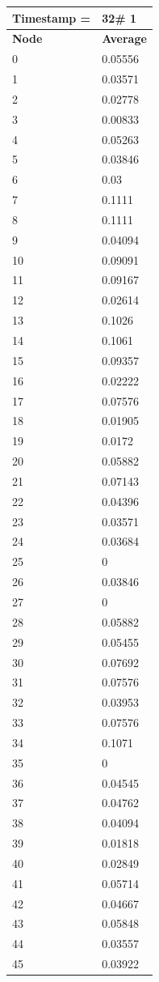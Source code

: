 \begin{tabular}{|l||l|}
\hline
\textbf{Timestamp =} & \textbf{32}\# 1\\\hline
	\textbf{Node} & \textbf{Average} \\ \hline
\hline
	0 & 0.05556 \\ \hline
	1 & 0.03571 \\ \hline
	2 & 0.02778 \\ \hline
	3 & 0.00833 \\ \hline
	4 & 0.05263 \\ \hline
	5 & 0.03846 \\ \hline
	6 & 0.03 \\ \hline
	7 & 0.1111 \\ \hline
	8 & 0.1111 \\ \hline
	9 & 0.04094 \\ \hline
	10 & 0.09091 \\ \hline
	11 & 0.09167 \\ \hline
	12 & 0.02614 \\ \hline
	13 & 0.1026 \\ \hline
	14 & 0.1061 \\ \hline
	15 & 0.09357 \\ \hline
	16 & 0.02222 \\ \hline
	17 & 0.07576 \\ \hline
	18 & 0.01905 \\ \hline
	19 & 0.0172 \\ \hline
	20 & 0.05882 \\ \hline
	21 & 0.07143 \\ \hline
	22 & 0.04396 \\ \hline
	23 & 0.03571 \\ \hline
	24 & 0.03684 \\ \hline
	25 & 0 \\ \hline
	26 & 0.03846 \\ \hline
	27 & 0 \\ \hline
	28 & 0.05882 \\ \hline
	29 & 0.05455 \\ \hline
	30 & 0.07692 \\ \hline
	31 & 0.07576 \\ \hline
	32 & 0.03953 \\ \hline
	33 & 0.07576 \\ \hline
	34 & 0.1071 \\ \hline
	35 & 0 \\ \hline
	36 & 0.04545 \\ \hline
	37 & 0.04762 \\ \hline
	38 & 0.04094 \\ \hline
	39 & 0.01818 \\ \hline
	40 & 0.02849 \\ \hline
	41 & 0.05714 \\ \hline
	42 & 0.04667 \\ \hline
	43 & 0.05848 \\ \hline
	44 & 0.03557 \\ \hline
	45 & 0.03922 \\ \hline
\end{tabular}
